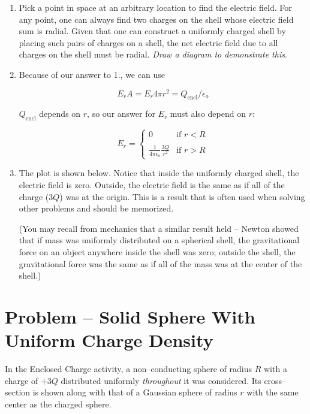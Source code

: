 \documentclass{article}
\newcommand{\ds}[0]{\displaystyle}
\begin{document}
\begin{enumerate}

  \item Pick a point in space at an arbitrary location to find the electric field. For any point, one can always find two charges on the shell whose electric field sum is radial. Given that one can construct a uniformly charged shell by placing such pairs of charges on a shell, the net electric field due to all charges on the shell must be radial. \emph{Draw a diagram to demonstrate this}.

  \item Because of our answer to 1., we can use

        $$E_rA = E_r 4\pi r^2 = {Q_{\text{encl}}}/{\epsilon_o}$$

        $Q_{\text{encl}}$ depends on $r$, so our answer for $E_r$ must also depend on $r$:

        $$
        E_r = \begin{cases}
          0   &\text{if } r < R \\\\
          \ds\frac{1}{4\pi\epsilon_o}\frac{3Q}{r^2} &\text{if } r > R
        \end{cases}
        $$

  \item The plot is shown below. Notice that inside the uniformly charged shell, the electric field is zero. Outside, the electric field is the same as if all of the charge ($3Q$) was at the origin. This is a result that is often used when solving other problems and should be memorized.

        (You may recall from mechanics that a similar result held -- Newton showed that if mass was uniformly distributed on a spherical shell, the gravitational force on an object anywhere inside the shell was zero; outside the shell, the gravitational force was the same as if all of the mass was at the center of the shell.)

        

\end{enumerate}

\newpage

\section{Problem -- Solid Sphere With Uniform Charge Density}

In the Enclosed Charge activity, a non--conducting sphere of radius $R$ with a charge of $+3Q$ distributed uniformly \emph{throughout} it was considered. Its cross--section is shown along with that of a Gaussian sphere of radius $r$ with the same center as the charged sphere.
\end{document}
